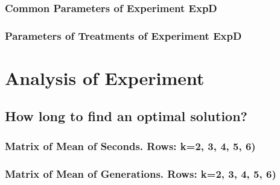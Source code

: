 \documentclass[18pt,c]{beamer}
\makeatletter
\let\beamer@writeslidentry@miniframeson=\beamer@writeslidentry
\newcommand*{\miniframeson}{\let\beamer@writeslidentry=\beamer@writeslidentry@miniframeson}
\makeatother
\begin{document}
 \begin{frame}
 \fontsize{8pt}{9pt}\selectfont
 \frametitle{ Common Parameters of Experiment ExpD }

 \label{ExpDCommonTable001.tex}  
 \end{frame}

 \begin{frame}
 \fontsize{8pt}{9pt}\selectfont
 \frametitle{ Parameters of Treatments of Experiment ExpD }

 \label{ExpDDifferentTable000.tex}  
 \end{frame}

\miniframeson
\section{Analysis of Experiment}
\miniframeson
\subsection{How long to find an optimal solution?}
 \begin{frame}
 \fontsize{8pt}{9pt}\selectfont
 \frametitle{ Matrix of Mean of Seconds.  Rows: k=2, 3, 4, 5, 6) }

 \label{ExpDMeanMatrixTable000.tex}  
 \end{frame}

 \begin{frame}
 \fontsize{8pt}{9pt}\selectfont
 \frametitle{ Matrix of Mean of Generations.  Rows: k=2, 3, 4, 5, 6) }

 \label{ExpDMeanMatrixTable001.tex}  
 \end{frame}
\end{document}
